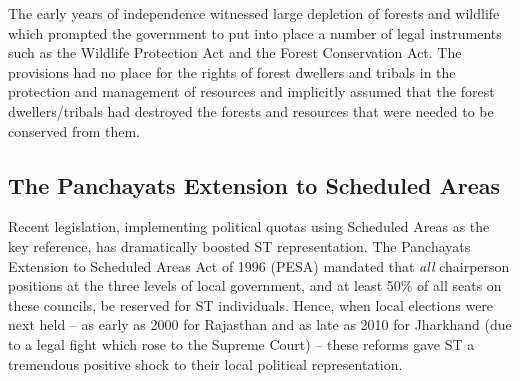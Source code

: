 \documentclass[12pt,reqno]{article}
\begin{document}

The early years of independence witnessed large depletion of forests and wildlife which prompted the government to put into place a number of legal instruments such as the Wildlife Protection Act and the Forest Conservation Act. The provisions had no place for the rights of forest dwellers and tribals in the protection and management of resources and implicitly assumed that the forest dwellers/tribals had destroyed the forests and resources that were needed to be conserved from them.








\subsection{The Panchayats Extension to Scheduled Areas}


Recent legislation, implementing political quotas using Scheduled Areas as the key reference, has dramatically boosted ST representation. The Panchayats Extension to Scheduled Areas Act of 1996 (PESA) mandated that {\it all} chairperson positions at the three levels of local government, and at least 50\% of all seats on these councils, be reserved for ST individuals. Hence, when local elections were next held -- as early as 2000 for Rajasthan and as late as 2010 for Jharkhand (due to a legal fight which rose to the Supreme Court) -- these reforms gave ST a tremendous positive shock to their local political representation.
\end{document}
